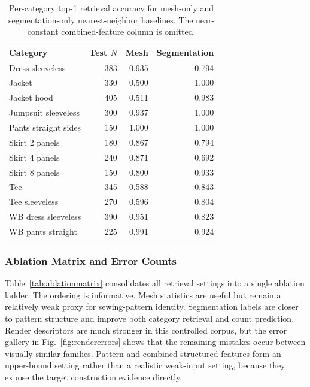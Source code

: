 \documentclass[pdflatex,sn-mathphys-num]{sn-jnl}
\begin{document}
\begin{table}[!htbp]
\caption{Per-category top-1 retrieval accuracy for mesh-only and segmentation-only nearest-neighbor baselines. The near-constant combined-feature column is omitted.}\label{tab:percategory}
\centering
\setlength{\tabcolsep}{4pt}
\begin{tabular*}{\textwidth}{@{\extracolsep{\fill}}lrrr}
\toprule
Category & Test \(N\) & Mesh & Segmentation \\
\midrule
Dress sleeveless & 383 & 0.935 & 0.794 \\
Jacket & 330 & 0.500 & 1.000 \\
Jacket hood & 405 & 0.511 & 0.983 \\
Jumpsuit sleeveless & 300 & 0.937 & 1.000 \\
Pants straight sides & 150 & 1.000 & 1.000 \\
Skirt 2 panels & 180 & 0.867 & 0.794 \\
Skirt 4 panels & 240 & 0.871 & 0.692 \\
Skirt 8 panels & 150 & 0.800 & 0.933 \\
Tee & 345 & 0.588 & 0.843 \\
Tee sleeveless & 270 & 0.596 & 0.804 \\
WB dress sleeveless & 390 & 0.951 & 0.823 \\
WB pants straight & 225 & 0.991 & 0.924 \\
\bottomrule
\end{tabular*}
\end{table}

\subsubsection{Ablation Matrix and Error Counts}\label{sec:ablation}

Table~\ref{tab:ablationmatrix} consolidates all retrieval settings into a single ablation ladder. The ordering is informative. Mesh statistics are useful but remain a relatively weak proxy for sewing-pattern identity. Segmentation labels are closer to pattern structure and improve both category retrieval and count prediction. Render descriptors are much stronger in this controlled corpus, but the error gallery in Fig.~\ref{fig:rendererrors} shows that the remaining mistakes occur between visually similar families. Pattern and combined structured features form an upper-bound setting rather than a realistic weak-input setting, because they expose the target construction evidence directly.
\end{document}
